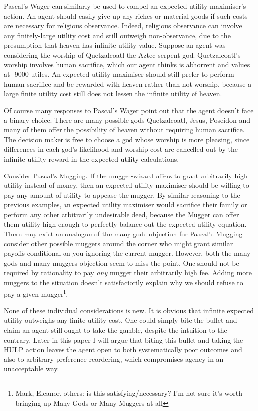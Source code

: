 \documentclass{article}
\begin{document}
Pascal's Wager can similarly be used to compel an expected utility maximiser's action. An agent should easily give up any riches or material goods if such costs are necessary for religious observance. Indeed, religious observance can involve any finitely-large utility cost and still outweigh non-observance, due to the presumption that heaven has infinite utility value. Suppose an agent was considering the worship of Quetzalcoatl the Aztec serpent god. Quetzalcoatl's worship involves human sacrifice, which our agent thinks is abhorrent and values at -9000 utiles. An expected utility maximiser should still prefer to perform human sacrifice and be rewarded with heaven rather than not worship, because a large finite utility cost still does not lessen the infinite utility of heaven. 

Of course many responses \citep{mackie1990miracle, diderot1746pensees} to Pascal's Wager point out that the agent doesn't face a binary choice. There are many possible gods \textemdash{} Quetzalcoatl, Jesus, Poseidon \textemdash{} and many of them offer the possibility of heaven without requiring human sacrifice. The decision maker is free to choose a god whose worship is more pleasing, since differences in each god's likelihood and worship-cost are cancelled out by the infinite utility reward in the expected utility calculations.

Consider Pascal's Mugging. If the mugger-wizard offers to grant arbitrarily high utility instead of money, then an expected utility maximiser should be willing to pay any amount of utility to appease the mugger. By similar reasoning to the previous examples, an expected utility maximiser would sacrifice their family or perform any other arbitrarily undesirable deed, because the Mugger can offer them utility high enough to perfectly balance out the expected utility equation. There may exist an analogue of the many gods objection for Pascal's Mugging \textemdash{} consider other possible muggers around the corner who might grant similar payoffs conditional on you ignoring the current mugger. However, both the many gods and many muggers objection seem to miss the point. One should not be required by rationality to pay \textit{any} mugger their arbitrarily high fee. Adding more muggers to the situation doesn't satisfactorily explain why we should refuse to pay a given mugger\footnote{Mark, Eleanor, others: is this satisfying/necessary? I'm not sure it's worth bringing up Many Gods or Many Muggers at all}.

None of these individual considerations is new. It is obvious that infinite expected utility outweighs any finite utility cost. One could simply bite the bullet and claim an agent still ought to take the gamble, despite the intuition to the contrary. Later in this paper I will argue that biting this bullet and taking the HULP action leaves the agent open to both systematically poor outcomes and also to arbitrary preference reordering, which compromises agency in an unacceptable way.
\end{document}

